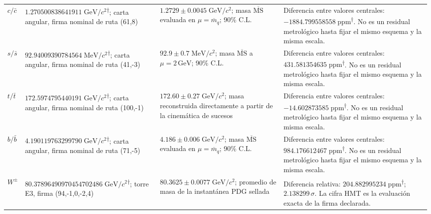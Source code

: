 \begin{longtable}{@{}>{\raggedright\arraybackslash}p{}>{\raggedright\arraybackslash}p{}>{\raggedright\arraybackslash}p{}>{\raggedright\arraybackslash}p{}@{}}
$c/\bar c$ & $1.270500\allowbreak{}838641\allowbreak{}911\;\mathrm{GeV}/c^2$\textsuperscript{\(\dagger\)}; carta angular, firma nominal de ruta (61,8) & $1.2729\pm0.0045\;\mathrm{GeV}/c^2$; masa $\overline{\mathrm{MS}}$ evaluada en $\mu=\overline{m}_q$; 90\% C.L. & Diferencia entre valores centrales: $-1884.799558\allowbreak{}558\;\mathrm{ppm}$\textsuperscript{\(\dagger\)}. No es un residual metrológico hasta fijar el mismo esquema y la misma escala. \\
$s/\bar s$ & $92.940093\allowbreak{}907845\allowbreak{}64\;\mathrm{MeV}/c^2$\textsuperscript{\(\dagger\)}; carta angular, firma nominal de ruta (41,-3) & $92.9\pm0.7\;\mathrm{MeV}/c^2$; masa $\overline{\mathrm{MS}}$ a $\mu=2\,\mathrm{GeV}$; 90\% C.L. & Diferencia entre valores centrales: $431.581354\allowbreak{}635\;\mathrm{ppm}$\textsuperscript{\(\dagger\)}. No es un residual metrológico hasta fijar el mismo esquema y la misma escala. \\
$t/\bar t$ & $172.597479\allowbreak{}544019\allowbreak{}1\;\mathrm{GeV}/c^2$\textsuperscript{\(\dagger\)}; carta angular, firma nominal de ruta (100,-1) & $172.60\pm0.27\;\mathrm{GeV}/c^2$; masa reconstruida directamente a partir de la cinemática de sucesos & Diferencia entre valores centrales: $-14.602873\allowbreak{}585\;\mathrm{ppm}$\textsuperscript{\(\dagger\)}. No es un residual metrológico hasta fijar el mismo esquema y la misma escala. \\
$b/\bar b$ & $4.190119\allowbreak{}763299\allowbreak{}790\;\mathrm{GeV}/c^2$\textsuperscript{\(\dagger\)}; carta angular, firma nominal de ruta (71,-5) & $4.186\pm0.006\;\mathrm{GeV}/c^2$; masa $\overline{\mathrm{MS}}$ evaluada en $\mu=\overline{m}_q$; 90\% C.L. & Diferencia entre valores centrales: $984.176612\allowbreak{}467\;\mathrm{ppm}$\textsuperscript{\(\dagger\)}. No es un residual metrológico hasta fijar el mismo esquema y la misma escala. \\
$W^\pm$ & $80.378964\allowbreak{}909704\allowbreak{}547024\allowbreak{}86\;\mathrm{GeV}/c^2$\textsuperscript{\(\dagger\)}; torre E3, firma (94,-1,0,-2,4) & $80.3625\pm0.0077\;\mathrm{GeV}/c^2$; promedio de masa de la instantánea PDG sellada & Diferencia relativa: $204.882995\allowbreak{}234\;\mathrm{ppm}$\textsuperscript{\(\dagger\)}; $2.138299\,\sigma$. La cifra HMT es la evaluación exacta de la firma declarada. \\

\end{longtable}
